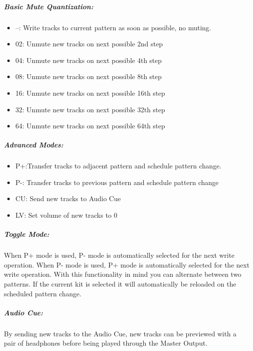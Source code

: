 \subparagraph{Basic Mute Quantization:}
\begin{itemize}
\item{--: Write tracks to current pattern as soon as possible, no muting.}
\item{02: Unmute new tracks on next possible 2nd step}
\item{04: Unmute new tracks on next possible 4th step}
\item{08: Unmute new tracks on next possible 8th step}
\item{16: Unmute new tracks on next possible 16th step}
\item{32: Unmute new tracks on next possible 32th step }
\item{64: Unmute new tracks on next possible 64th step}
\end{itemize}

\subparagraph{Advanced Modes:}
\begin{itemize}
\item{P+:Transfer tracks to adjacent pattern and schedule pattern change.}
\item{P-: Transfer tracks to previous pattern and schedule pattern change}

\item{CU: Send new tracks to Audio Cue }
\item{LV: Set volume of new tracks to 0}
\end{itemize}


\subparagraph{Toggle Mode:}
When P+ mode is used, P- mode is automatically selected for the next write operation. When P- mode is used, P+ mode is automatically selected for the next write operation. With this functionality in mind you can alternate between two patterns. If the current kit is selected it will automatically be reloaded on the scheduled pattern change.

\subparagraph{Audio Cue:}

By sending new tracks to the Audio Cue, new tracks can be previewed with a pair of headphones before being played through the Master Output.
